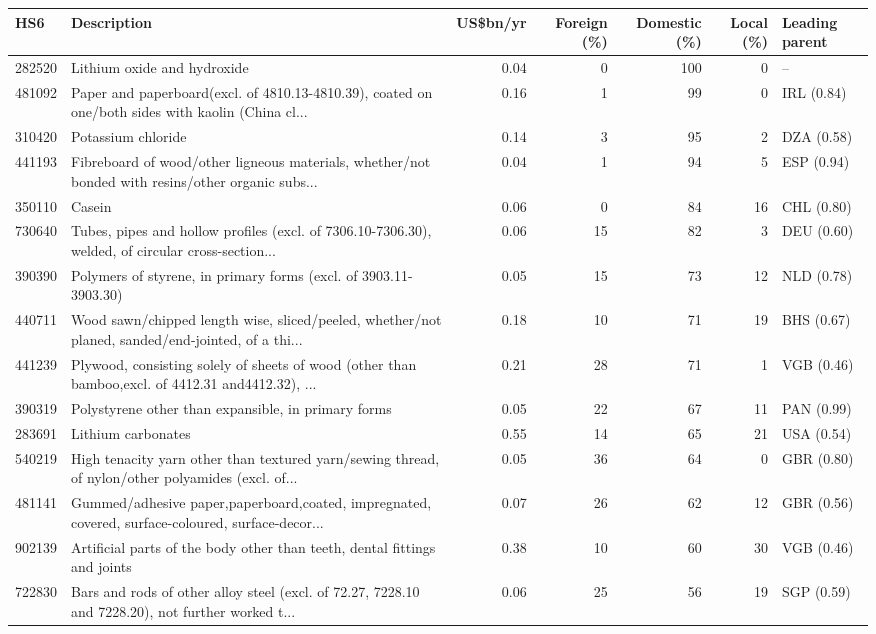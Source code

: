 \begin{tabular}{@{}l p{6.4cm} r r r r l@{}}
\toprule
HS6 & Description & US\$bn/yr & Foreign (\%) & Domestic (\%) & Local (\%) & Leading parent \\
\midrule
282520 & Lithium oxide and hydroxide & 0.04 & 0 & 100 & 0 & -- \\
481092 & Paper and paperboard(excl. of 4810.13-4810.39), coated on one/\allowbreak{}both sides with kaolin (China cl... & 0.16 & 1 & 99 & 0 & IRL (0.84) \\
310420 & Potassium chloride & 0.14 & 3 & 95 & 2 & DZA (0.58) \\
441193 & Fibreboard of wood/\allowbreak{}other ligneous materials, whether/\allowbreak{}not bonded with resins/\allowbreak{}other organic subs... & 0.04 & 1 & 94 & 5 & ESP (0.94) \\
350110 & Casein & 0.06 & 0 & 84 & 16 & CHL (0.80) \\
730640 & Tubes, pipes and hollow profiles (excl. of 7306.10-7306.30), welded, of circular cross-section... & 0.06 & 15 & 82 & 3 & DEU (0.60) \\
390390 & Polymers of styrene, in primary forms (excl. of 3903.11-3903.30) & 0.05 & 15 & 73 & 12 & NLD (0.78) \\
440711 & Wood sawn/\allowbreak{}chipped length wise, sliced/\allowbreak{}peeled, whether/\allowbreak{}not planed, sanded/\allowbreak{}end-jointed, of a thi... & 0.18 & 10 & 71 & 19 & BHS (0.67) \\
441239 & Plywood, consisting solely of sheets of wood (other than bamboo,excl. of 4412.31 and4412.32), ... & 0.21 & 28 & 71 & 1 & VGB (0.46) \\
390319 & Polystyrene other than expansible, in primary forms & 0.05 & 22 & 67 & 11 & PAN (0.99) \\
283691 & Lithium carbonates & 0.55 & 14 & 65 & 21 & USA (0.54) \\
540219 & High tenacity yarn other than textured yarn/\allowbreak{}sewing thread, of nylon/\allowbreak{}other polyamides (excl. of... & 0.05 & 36 & 64 & 0 & GBR (0.80) \\
481141 & Gummed/\allowbreak{}adhesive paper,paperboard,coated, impregnated, covered, surface-coloured, surface-decor... & 0.07 & 26 & 62 & 12 & GBR (0.56) \\
902139 & Artificial parts of the body other than teeth, dental fittings and joints & 0.38 & 10 & 60 & 30 & VGB (0.46) \\
722830 & Bars and rods of other alloy steel (excl. of 72.27, 7228.10 and 7228.20), not further worked t... & 0.06 & 25 & 56 & 19 & SGP (0.59) \\

\end{tabular}
